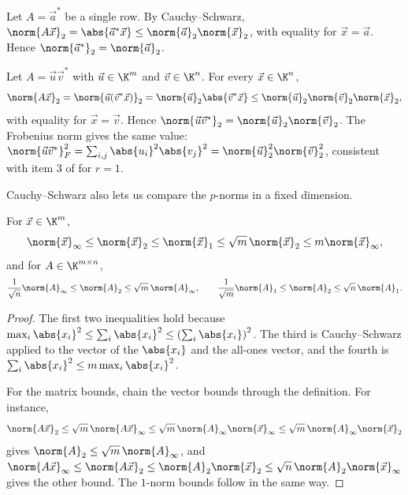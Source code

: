 \begin{example}
  Let $A = \vec{a}^\ast$ be a single row. By Cauchy--Schwarz, $\norm{A\vec{x}}_2 = \abs{\vec{a}^\ast\vec{x}} \le \norm{\vec{a}}_2\norm{\vec{x}}_2$, with equality for $\vec{x} = \vec{a}$. Hence $\norm{\vec{a}^\ast}_2 = \norm{\vec{a}}_2$.
\end{example}

\begin{example}
  \label{ex:outer-norm}
  Let $A = \vec{u}\vec{v}^\ast$ with $\vec{u} \in \K^m$ and $\vec{v} \in \K^n$. For every $\vec{x} \in \K^n$,
  \begin{equation}
    \norm{A\vec{x}}_2 = \norm{\vec{u}(\vec{v}^\ast\vec{x})}_2 = \norm{\vec{u}}_2\abs{\vec{v}^\ast\vec{x}} \le \norm{\vec{u}}_2\norm{\vec{v}}_2\norm{\vec{x}}_2,
  \end{equation}
  with equality for $\vec{x} = \vec{v}$. Hence $\norm{\vec{u}\vec{v}^\ast}_2 = \norm{\vec{u}}_2\norm{\vec{v}}_2$. The Frobenius norm gives the same value: $\norm{\vec{u}\vec{v}^\ast}_F^2 = \sum_{i,j}\abs{u_i}^2\abs{v_j}^2 = \norm{\vec{u}}_2^2\norm{\vec{v}}_2^2$, consistent with item 3 of  for $r = 1$.
\end{example}

Cauchy--Schwarz also lets us compare the $p$-norms in a fixed dimension.

\begin{corollary}
  \label{cor:pnorm-compare}
  For $\vec{x} \in \K^m$,
  \begin{equation}
    \norm{\vec{x}}_\infty \le \norm{\vec{x}}_2 \le \norm{\vec{x}}_1 \le \sqrt{m}\,\norm{\vec{x}}_2 \le m\norm{\vec{x}}_\infty,
  \end{equation}
  and for $A \in \K^{m \times n}$,
  \begin{equation}
    \frac{1}{\sqrt{n}}\norm{A}_\infty \le \norm{A}_2 \le \sqrt{m}\,\norm{A}_\infty, \qquad \frac{1}{\sqrt{m}}\norm{A}_1 \le \norm{A}_2 \le \sqrt{n}\,\norm{A}_1.
  \end{equation}
\end{corollary}

\begin{proof}
  The first two inequalities hold because $\max_i\abs{x_i}^2 \le \sum_i\abs{x_i}^2 \le \left(\sum_i\abs{x_i}\right)^2$. The third is Cauchy--Schwarz applied to the vector of the $\abs{x_i}$ and the all-ones vector, and the fourth is $\sum_i\abs{x_i}^2 \le m\max_i\abs{x_i}^2$.

  For the matrix bounds, chain the vector bounds through the definition. For instance,
  \begin{equation}
    \norm{A\vec{x}}_2 \le \sqrt{m}\,\norm{A\vec{x}}_\infty \le \sqrt{m}\,\norm{A}_\infty\norm{\vec{x}}_\infty \le \sqrt{m}\,\norm{A}_\infty\norm{\vec{x}}_2
  \end{equation}
  gives $\norm{A}_2 \le \sqrt{m}\,\norm{A}_\infty$, and $\norm{A\vec{x}}_\infty \le \norm{A\vec{x}}_2 \le \norm{A}_2\norm{\vec{x}}_2 \le \sqrt{n}\,\norm{A}_2\norm{\vec{x}}_\infty$ gives the other bound. The $1$-norm bounds follow in the same way.
\end{proof}

